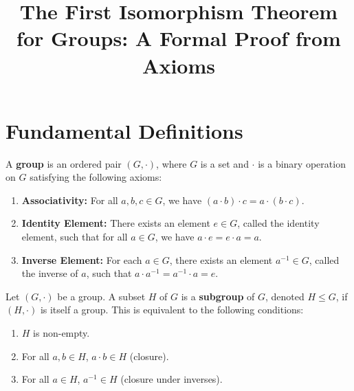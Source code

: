%


\title{The First Isomorphism Theorem for Groups: A Formal Proof from Axioms}
\author{}
\date{}


\section{Fundamental Definitions}

\begin{definition}[Group]
\label{def:group}
A \textbf{group} is an ordered pair $(G, \cdot)$, where $G$ is a set and $\cdot$ is a binary operation on $G$ satisfying the following axioms:
\begin{enumerate}
    \item \textbf{Associativity:} For all $a, b, c \in G$, we have $(a \cdot b) \cdot c = a \cdot (b \cdot c)$.
    \item \textbf{Identity Element:} There exists an element $e \in G$, called the identity element, such that for all $a \in G$, we have $a \cdot e = e \cdot a = a$.
    \item \textbf{Inverse Element:} For each $a \in G$, there exists an element $a^{-1} \in G$, called the inverse of $a$, such that $a \cdot a^{-1} = a^{-1} \cdot a = e$.
\end{enumerate}
\end{definition}

\begin{definition}[Subgroup]
\label{def:subgroup}
Let $(G, \cdot)$ be a group. A subset $H$ of $G$ is a \textbf{subgroup} of $G$, denoted $H \leq G$, if $(H, \cdot)$ is itself a group. This is equivalent to the following conditions:
\begin{enumerate}
    \item $H$ is non-empty.
    \item For all $a, b \in H$, $a \cdot b \in H$ (closure).
    \item For all $a \in H$, $a^{-1} \in H$ (closure under inverses).
\end{enumerate}
\end{definition}

